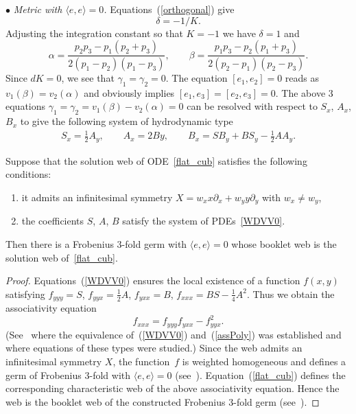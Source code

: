 $\bullet$ {\it Metric with $\langle e,e\rangle =0$.}
Equations~(\ref{orthogonal}) give
\begin{equation}\label{dfor0}
\delta=-1/K.
\end{equation} Adjusting the integration constant so that $K=-1$ we have $\delta =1$ and
\begin{equation}\label{alphabeta0}
\alpha =\frac{p_2p_3-p_1(p_2+p_3)}{2(p_1-p_2)(p_1-p_3)},\qquad \beta =\frac{p_1p_3-p_2(p_1+p_3)}{2(p_2-p_1)(p_2-p_3)}.
\end{equation}
Since $dK=0$, we see that $\gamma_1=\gamma_2=0$.
The equation $[e_1,e_2]=0$ reads as $v_1(\beta)=v_2(\alpha)$ and obviously implies $[e_1,e_3]=[e_2,e_3]=0$.
The above 3 equations $\gamma_1=\gamma_2=v_1(\beta)-v_2(\alpha)=0$
can be resolved with respect to $S_x$, $A_x$, $B_x$
to give the following system of hydrodynamic type
\begin{gather}\label{WDVV0}
S_x= \frac{1}{2}A_y,\qquad
A_x= 2By,\qquad
B_x= SB_y+BS_y-\frac{1}{2}AA_y.
\end{gather}
\begin{lemma}\label{web_ass_0}
Suppose that the solution web of ODE~\eqref{flat_cub} satisfies the following conditions:
\begin{enumerate}\itemsep=0pt
\item[$1)$] it admits an infinitesimal symmetry $X=w_xx\partial_x+w_yy\partial_y$ with $w_x\ne w_y$,
\item[$2)$] the coefficients $S$, $A$, $B$ satisfy the system of PDEs~\eqref{WDVV0}.
\end{enumerate}
Then there is a Frobenius $3$-fold germ with $\langle e,e\rangle =0$ whose booklet web is the solution web of~\eqref{flat_cub}.
\end{lemma}
\begin{proof}
Equations~(\ref{WDVV0}) ensures the local existence of a function $f(x,y)$ satisfying
$f_{yyy}=S$, $f_{yyx}=\frac{1}{2}A$, $f_{yxx}=B$, $f_{xxx}=BS-\frac{1}{4}A^2$.
Thus we obtain the associativity equation
\begin{equation}\label{assPoly}
f_{xxx}=f_{yyy}f_{yxx}-f^2_{yyx}.
\end{equation}
(See~\cite{MFa} where the equivalence of~(\ref{WDVV0}) and~(\ref{assPoly}) was established and~\cite{Al} where equations of these types were studied.)
Since the web admits an inf\/initesimal symmetry $X$, the function~$f$ is weighted homogeneous and def\/ines a germ of Frobenius $3$-fold with $\langle e,e\rangle =0$ (see~\cite{Df}). Equation~(\ref{flat_cub}) def\/ines the corresponding characteristic web of the above associativity equation. Hence the web is the booklet web of the constructed Frobenius $3$-fold germ (see~\cite{Aw}).
\end{proof}

